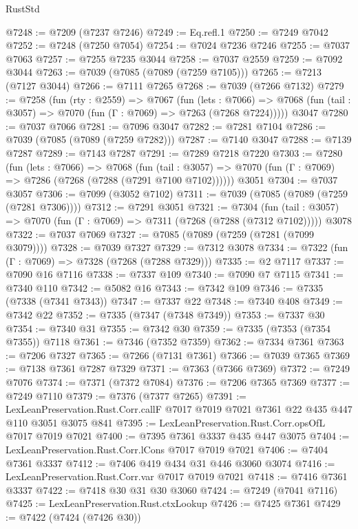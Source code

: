 \begin{lexlean}{RustStd}
\begin{coremodule}
{\begin{coremodule}
{{{{{{{{{{{{{{{{{{{{{{{{{{{{{{{{@7248 := @7209 (@7237 @7246)
@7249 := Eq.refl.{1}
@7250 := @7249 @7042
@7252 := @7248 (@7250 @7054)
@7254 := @7024 @7236 @7246
@7255 := @7037 @7063
@7257 := @7255 @7235 @3044
@7258 := @7037 @2559
@7259 := @7092 @3044
@7263 := @7039 (@7085 (@7089 (@7259 @7105)))
@7265 := @7213 (@7127 @3044)
@7266 := @7111 @7265
@7268 := @7039 (@7266 @7132)
@7279 := @7258
    (fun (rty : @2559) =>
    @7067
      (fun (lets : @7066) =>
      @7068 (fun (tail : @3057) => @7070 (fun (Γ : @7069) => @7263 (@7268 @7224)))))
    @3047
@7280 := @7037 @7066
@7281 := @7096 @3047
@7282 := @7281 @7104
@7286 := @7039 (@7085 (@7089 (@7259 @7282)))
@7287 := @7140 @3047
@7288 := @7139 @7287
@7289 := @7143 @7287
@7291 := @7289 @7218 @7220
@7303 := @7280
    (fun (lets : @7066) =>
    @7068
      (fun (tail : @3057) => @7070 (fun (Γ : @7069) => @7286 (@7268 (@7288 (@7291 @7100 @7102))))))
    @3051
@7304 := @7037 @3057
@7306 := @7099 (@3052 @7102)
@7311 := @7039 (@7085 (@7089 (@7259 (@7281 @7306))))
@7312 := @7291 @3051
@7321 := @7304
    (fun (tail : @3057) => @7070 (fun (Γ : @7069) => @7311 (@7268 (@7288 (@7312 @7102)))))
    @3078
@7322 := @7037 @7069
@7327 := @7085 (@7089 (@7259 (@7281 (@7099 @3079))))
@7328 := @7039 @7327
@7329 := @7312 @3078
@7334 := @7322 (fun (Γ : @7069) => @7328 (@7268 (@7288 @7329)))
@7335 := @2 @7117
@7337 := @7090 @16 @7116
@7338 := @7337 @109
@7340 := @7090 @7 @7115
@7341 := @7340 @110
@7342 := @5082 @16
@7343 := @7342 @109
@7346 := @7335 (@7338 (@7341 @7343))
@7347 := @7337 @22
@7348 := @7340 @408
@7349 := @7342 @22
@7352 := @7335 (@7347 (@7348 @7349))
@7353 := @7337 @30
@7354 := @7340 @31
@7355 := @7342 @30
@7359 := @7335 (@7353 (@7354 @7355)) @7118
@7361 := @7346 (@7352 @7359)
@7362 := @7334 @7361
@7363 := @7206 @7327
@7365 := @7266 (@7131 @7361)
@7366 := @7039 @7365
@7369 := @7138 @7361 @7287 @7329
@7371 := @7363 (@7366 @7369)
@7372 := @7249 @7076
@7374 := @7371 (@7372 @7084)
@7376 := @7206 @7365 @7369
@7377 := @7249 @7110
@7379 := @7376 (@7377 @7265)
@7391 := LexLeanPreservation.Rust.Corr.callF
    @7017
    @7019
    @7021
    @7361
    @22
    @435
    @447
    @110
    @3051
    @3075
    @841
@7395 := LexLeanPreservation.Rust.Corr.opsOfL @7017 @7019 @7021
@7400 := @7395 @7361 @3337 @435 @447 @3075
@7404 := LexLeanPreservation.Rust.Corr.lCons @7017 @7019 @7021
@7406 := @7404 @7361 @3337
@7412 := @7406 @419 @434 @31 @446 @3060 @3074
@7416 := LexLeanPreservation.Rust.Corr.var @7017 @7019 @7021
@7418 := @7416 @7361 @3337
@7422 := @7418 @30 @31 @30 @3060
@7424 := @7249 (@7041 @7116)
@7425 := LexLeanPreservation.Rust.ctxLookup
@7426 := @7425 @7361
@7429 := @7422 (@7424 (@7426 @30))
}}}}}}}}}}}}}}}}}}}}}}}}}}}}}}}}
\end{coremodule}}
\end{coremodule}
\end{lexlean}
